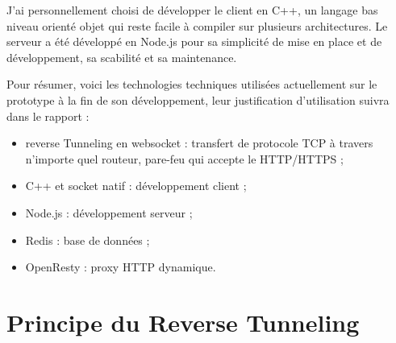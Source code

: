 J'ai personnellement choisi de développer le client en C++, un langage
bas niveau orienté objet qui reste facile à compiler sur plusieurs
architectures. Le serveur a été développé en Node.js pour sa simplicité
de mise en place et de développement, sa scabilité et sa maintenance.

Pour résumer, voici les technologies techniques utilisées actuellement
sur le prototype à la fin de son développement, leur justification
d'utilisation suivra dans le rapport :
\begin{itemize}
\item reverse Tunneling en websocket : transfert de protocole TCP à
  travers n'importe quel routeur, pare-feu qui accepte le HTTP/HTTPS ;
\item C++ et socket natif : développement client ;
\item Node.js : développement serveur ;
\item Redis : base de données ;
\item OpenResty : proxy HTTP dynamique.
\end{itemize}

\section{Principe du Reverse Tunneling}

